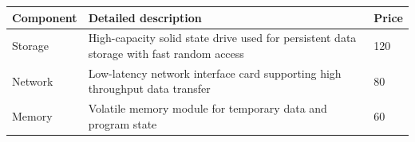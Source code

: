 \begin{table}[htbp]
\centering
\begin{tabular}{lp{7cm}p{3cm}}
\toprule
Component & Detailed description & Price \\
\midrule
Storage & High-capacity solid state drive used for persistent data storage with fast random access & 120 \\
Network & Low-latency network interface card supporting high throughput data transfer & 80 \\
Memory & Volatile memory module for temporary data and program state & 60 \\
\bottomrule
\end{tabular}
\end{table}

